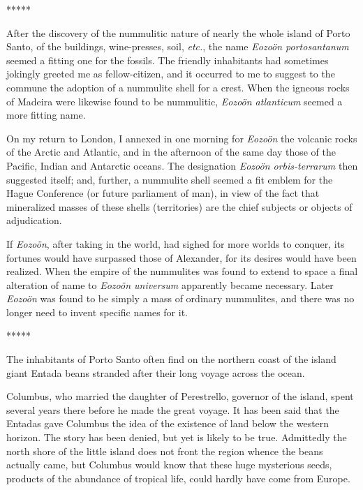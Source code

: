 \documentclass[a4paper, 12pt, oneside, landscape]{article}
\begin{document}
\centerline{*\hspace{15mm}*\hspace{15mm}*\hspace{15mm}*\hspace{15mm}*}
\bigskip

After the discovery of the nummulitic nature of nearly the whole island of Porto Santo, of the buildings, wine-presses, soil, \emph{etc.}, the name \emph{Eozoön portosantanum} seemed a fitting one for the fossils. The friendly inhabitants had sometimes jokingly greeted me as fellow-citizen, and it occurred to me to suggest to the commune the adoption of a nummulite shell for a crest. When the igneous rocks of Madeira were likewise found to be nummulitic, \emph{Eozoön atlanticum} seemed a more fitting name.

On my return to London, I annexed in one morning for \emph{Eozoön} the volcanic rocks of the Arctic and Atlantic, and in the afternoon of the same day those of the Pacific, Indian and Antarctic oceans. The designation \emph{Eozoön orbis-terrarum} then suggested itself; and, further, a nummulite shell seemed a fit emblem for the Hague Conference (or future parliament of man), in view of the fact that mineralized masses of these shells (territories) are the chief subjects or objects of adjudication.

If \emph{Eozoön}, after taking in the world, had sighed for more worlds to conquer, its fortunes would have surpassed those of Alexander, for its desires would have been realized. When the empire of the nummulites was found to extend to space a final alteration of name to \emph{Eozoön universum} apparently became necessary. Later \emph{Eozoön} was found to be simply a mass of ordinary nummulites, and there was no longer need to invent specific names for it.

\centerline{*\hspace{15mm}*\hspace{15mm}*\hspace{15mm}*\hspace{15mm}*}
\bigskip

The inhabitants of Porto Santo often find on the northern coast of the island giant Entada beans stranded after their long voyage across the ocean.

Columbus, who married the daughter of Perestrello, governor of the island, spent several years there before he made the great voyage. It has been said that the Entadas gave Columbus the idea of the existence of land below the western horizon. The story has been denied, but yet is likely to be true. Admittedly the north shore of the little island does not front the region whence the beans actually came, but Columbus would know that these huge mysterious seeds, products of the abundance of tropical life, could hardly have come from Europe.
\end{document}
